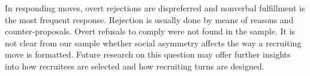 \documentclass[output=paper,modfonts,nonflat]{langsci/langscibook}
\begin{document}
In responding moves, overt rejections are dispreferred and nonverbal fulfillment is the most frequent response. Rejection is usually done by means of reasons and counter-proposals. Overt refusals to comply were not found in the sample. It is not clear from our sample whether social asymmetry affects the way a recruiting move is formatted. Future research on this question may offer further insights into how recruitees are selected and how recruiting turns are designed.

\sloppy\printbibliography[heading=subbibliography,notkeyword=this]
\end{document}
